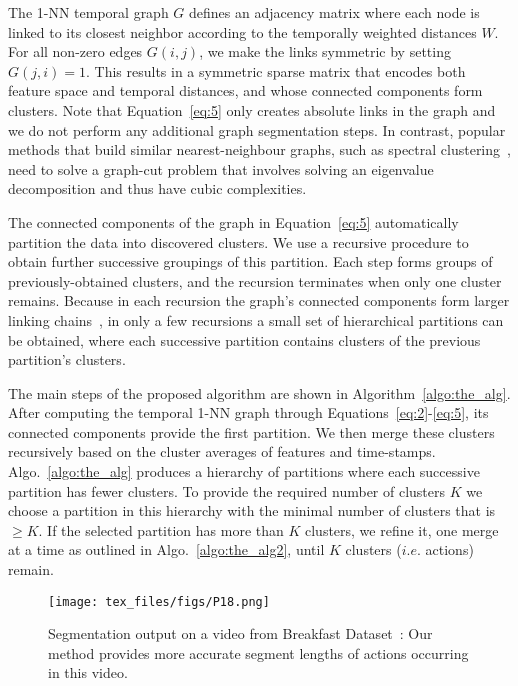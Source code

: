 \documentclass[10pt,twocolumn,letterpaper]{article}
\begin{document}
The 1-NN temporal graph $G$ defines an adjacency matrix where each node is linked to its closest neighbor according to the temporally weighted distances $W$. For all non-zero edges $G(i,j)$, we make the links symmetric by setting $G(j,i)=1$.
This results in a symmetric sparse matrix that encodes both feature space and temporal distances, and whose connected components form clusters.
Note that Equation~\ref{eq:5} only creates absolute links in the graph and we do not perform any additional graph segmentation steps. In contrast, popular methods that build similar nearest-neighbour graphs, such as spectral clustering~\cite{von2007tutorial}, need to solve a graph-cut problem that involves solving an eigenvalue decomposition and thus have cubic complexities.

The connected components of the graph in Equation~\ref{eq:5} automatically partition the data into discovered clusters.
We use a recursive procedure to obtain further successive groupings of this partition.
Each step forms groups of previously-obtained clusters, and the recursion terminates when only one cluster remains.
Because in each recursion the graph's connected components form larger linking chains~\cite{finch}, in only a few recursions a small set of hierarchical partitions can be obtained, where each successive partition contains clusters of the previous partition's clusters.


The main steps of the proposed algorithm are shown in Algorithm~\ref{algo:the_alg}. After computing the temporal 1-NN graph through Equations~\ref{eq:2}-\ref{eq:5}, its connected components provide the first partition. We then merge these clusters recursively based on the cluster averages of features and time-stamps. Algo.~\ref{algo:the_alg} produces a hierarchy of partitions where each successive partition has fewer clusters.
To provide the required number of clusters $K$ we choose a partition in this hierarchy with the minimal number of clusters that is $\geq K$. If the selected partition has more than $K$ clusters, we refine it, one merge at a time as outlined in Algo.~\ref{algo:the_alg2}, until $K$ clusters ($i.e.$ actions) remain.

\begin{figure}
    \centering
    \texttt{[image: tex\_files/figs/P18.png]}
\caption{Segmentation output on a video from Breakfast Dataset~\cite{ute_15}: Our method provides more accurate segment lengths of actions occurring in this video.\label{fig:vis_method}}
    \vspace{-0.3cm}
\end{figure}
\end{document}
